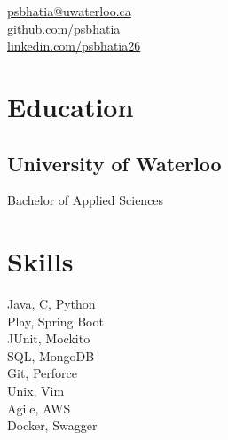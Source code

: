 \documentclass[]{hieudo-build}
\begin{document}
%
%
\color{myyellow}
{
	\color{myblue}\faEnvelope \href{mailto:psbhatia@uwaterloo.ca}{ psbhatia@uwaterloo.ca}\\
	\faGithub \href{https://github.com/psbhatia}{   github.com/psbhatia}\\
	\faLinkedinSquare \href{https://www.linkedin.com/in/psbhatia26}{   linkedin.com/psbhatia26}
}
    
%
%
\begin{minipage}[t]{0.34\textwidth}
\section{Education} 

\subsection{University of Waterloo}
Bachelor of Applied Sciences \\
\sectionsep


\section{Skills}
Java, C, Python\\ 

Play, Spring Boot\\
JUnit, Mockito\\

SQL, MongoDB\\

Git, Perforce \\
Unix, Vim \\ 
Agile, AWS \\ 
Docker, Swagger \\

\sectionsep



\end{minipage}
\end{document}
